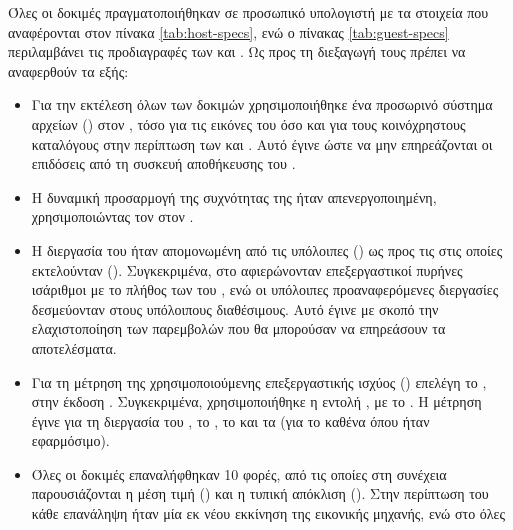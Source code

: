Όλες οι δοκιμές πραγματοποιήθηκαν σε προσωπικό υπολογιστή με τα στοιχεία που
αναφέρονται στον πίνακα \ref{tab:host-specs}, ενώ ο πίνακας
\ref{tab:guest-specs} περιλαμβάνει τις προδιαγραφές των \osv{} και \linux{}
. Ως προς τη διεξαγωγή τους πρέπει να αναφερθούν τα εξής:
\begin{itemize}
    \item Για την εκτέλεση όλων των δοκιμών χρησιμοποιήθηκε ένα προσωρινό
          σύστημα αρχείων () %
          στον \host{}, τόσο για τις εικόνες του \osv{} όσο και για τους
          κοινόχρηστους καταλόγους στην περίπτωση των \viofs{} και .
          Αυτό έγινε ώστε να μην επηρεάζονται οι επιδόσεις από τη συσκευή
          αποθήκευσης του \host{}.
    \item Η δυναμική προσαρμογή της συχνότητας της  ήταν
          απενεργοποιημένη, χρησιμοποιώντας τον  %
          στον \host{}.
    \item Η διεργασία του \qemu{} ήταν απομονωμένη από τις υπόλοιπες
          () ως προς τις  στις οποίες
          εκτελούνταν (). %
          Συγκεκριμένα, στο \qemu{} αφιερώνονταν επεξεργαστικοί πυρήνες
          ισάριθμοι με το πλήθος των  του \guest{}, ενώ οι υπόλοιπες
          προαναφερόμενες διεργασίες δεσμεύονταν στους υπόλοιπους διαθέσιμους.
          Αυτό έγινε με σκοπό την ελαχιστοποίηση των παρεμβολών που θα μπορούσαν
          να επηρεάσουν τα αποτελέσματα.
    \item Για τη μέτρηση της χρησιμοποιούμενης επεξεργαστικής ισχύος () επελέγη το  \cite{perf}, στην έκδοση
          . Συγκεκριμένα, χρησιμοποιήθηκε η εντολή
          \texttt{}, με το . Η
          μέτρηση έγινε για τη διεργασία του \qemu{}, το , το
           \cite{stefanha:vhost} και τα  (για το καθένα όπου ήταν εφαρμόσιμο).
    \item Όλες οι δοκιμές επαναλήφθηκαν 10 φορές, από τις οποίες στη συνέχεια
          παρουσιάζονται η μέση τιμή () και η τυπική απόκλιση
          (). Στην περίπτωση του \osv{} κάθε επανάληψη
          ήταν μία εκ νέου εκκίνηση της εικονικής μηχανής, ενώ στο \linux{} όλες

\end{itemize}
